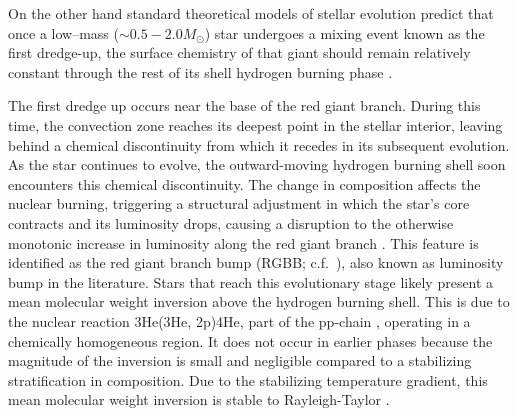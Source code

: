 On the other hand standard theoretical models of stellar evolution predict that once a low--mass ($\sim 0.5 -2.0 M_{\odot}$) star undergoes a mixing event known as the first dredge-up, the surface chemistry of that giant should remain relatively constant through the rest of its shell hydrogen burning phase \citep[e.g][]{iben1964, Iben1967}. 

The first dredge up occurs near the base of the red giant branch. During this time, the convection zone reaches its deepest point in the stellar interior, leaving behind a chemical discontinuity from which it recedes in its subsequent evolution. %
As the star continues to evolve, the outward-moving hydrogen burning shell soon encounters this chemical discontinuity. The change in composition affects the nuclear burning, 
triggering a structural adjustment in which the star's core contracts and its luminosity drops, causing a disruption to the otherwise monotonic increase in luminosity along the red giant branch \citep{Christensen-Dalsgaard:2015}. This feature is identified as the red giant branch bump (RGBB; c.f.\ \citealt{Joyce2015, Khan2018}), also known as luminosity bump in the literature. Stars that reach this evolutionary stage likely present a mean molecular weight inversion above the hydrogen burning shell. This is due to the nuclear reaction 3He(3He, 2p)4He, part of the pp-chain  \citep{Ulrich_1972}, operating in a chemically homogeneous region. It does not occur in earlier phases because the magnitude of the inversion is small and negligible compared to a stabilizing stratification in composition.
Due to the stabilizing temperature gradient, this mean molecular weight inversion is stable to Rayleigh-Taylor \citep{CantielloLanger2010}. 



